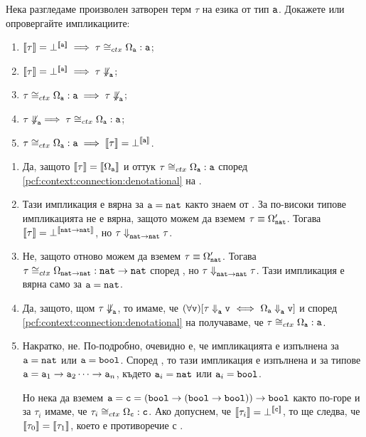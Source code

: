 \begin{problem}
  Нека разгледаме произволен затворен терм $\tau$ на езика \PCFBOOL от тип $\texttt{a}$. 
  Докажете или опровергайте импликациите:
  \begin{enumerate}[(1)]
  \item
    $\llbracket{\tau}\rrbracket = \bot^{\llbracket{\texttt{a}}\rrbracket} \implies \tau \cong_{ctx} \Omega_{\texttt{a}} : \texttt{a}$;
  \item
    $\llbracket{\tau}\rrbracket = \bot^{\llbracket{\texttt{a}}\rrbracket} \implies \tau \not\Downarrow^{}_{\texttt{a}}$;
  \item
    $\tau \cong_{ctx} \Omega_{\texttt{a}} : \texttt{a} \implies \tau \not\Downarrow^{}_{\texttt{a}}$;
  \item
    $\tau \not\Downarrow^{}_{\texttt{a}} \implies \tau \cong_{ctx} \Omega_{\texttt{a}} : \texttt{a}$;
  \item
    $\tau \cong_{ctx} \Omega_{\texttt{a}} : \texttt{a} \implies \llbracket{\tau}\rrbracket = \bot^{\llbracket{\texttt{a}}\rrbracket}$.
  \end{enumerate}
\end{problem}
\begin{hint}
  \begin{enumerate}[(1)]
  \item
    Да, защото $\llbracket{\tau}\rrbracket = \llbracket{\Omega_{\texttt{a}}}\rrbracket$ и оттук $\tau \cong_{ctx} \Omega_{\texttt{a}} : \texttt{a}$
    според \ref{pcf:context:connection:denotational} на .
  \item
    Тази импликация е вярна за $\texttt{a} = \texttt{nat}$ както знаем от .
    За по-високи типове импликацията не е вярна, защото можем да вземем $\tau \equiv \Omega'_{\texttt{nat}}$.
    Тогава $\llbracket{\tau}\rrbracket = \bot^{\llbracket{\texttt{nat}\to\texttt{nat}}\rrbracket}$, но $\tau \Downarrow^{}_{\texttt{nat}\to\texttt{nat}} \tau$.
  \item
    Не, защото отново можем да вземем $\tau \equiv \Omega'_{\texttt{nat}}$.
    Тогава $\tau \cong_{ctx} \Omega_{\texttt{nat}\to\texttt{nat}} : \texttt{nat}\to\texttt{nat}$ според , но $\tau \Downarrow^{}_{\texttt{nat}\to\texttt{nat}} \tau$.
    Тази импликация е вярна само за $\texttt{a} = \texttt{nat}$.
  \item
    Да, защото, щом $\tau \not\Downarrow^{}_{\texttt{a}}$, то имаме, че
    $(\forall \texttt{v})[\tau \Downarrow^{}_{\texttt{a}} \texttt{v} \ \Longleftrightarrow\  \Omega_{\texttt{a}} \Downarrow^{}_{\texttt{a}} \texttt{v}]$
    и според \ref{pcf:context:connection:denotational} на 
    получаваме, че $\tau \cong_{ctx} \Omega_{\texttt{a}} : \texttt{a}$.
  \item
    Накратко, не. По-подробно, очевидно е, че импликацията е изпълнена за $\texttt{a} = \texttt{nat}$ или $\texttt{a} = \texttt{bool}$.
    Според , то тази импликация е изпълнена и за
    типове $\texttt{a} = \texttt{a}_1 \to \texttt{a}_2 \cdots \to \texttt{a}_n$, където $\texttt{a}_i = \texttt{nat}$ или $\texttt{a}_i = \texttt{bool}$.
    
    Но нека да вземем $\texttt{a} = \texttt{c} = (\texttt{bool} \to (\texttt{bool} \to \texttt{bool}))\to\texttt{bool}$ както по-горе и за $\tau_i$ имаме, че $\tau_i \cong_{ctx} \Omega_{\texttt{c}} : \texttt{c}$.
    Ако допуснем, че $\llbracket{\tau_i}\rrbracket = \bot^{\llbracket{\texttt{c}}\rrbracket}$, то ще следва, че $\llbracket{\tau_0}\rrbracket = \llbracket{\tau_1}\rrbracket$,
    което е противоречие с .    
  \end{enumerate}
\end{hint}

